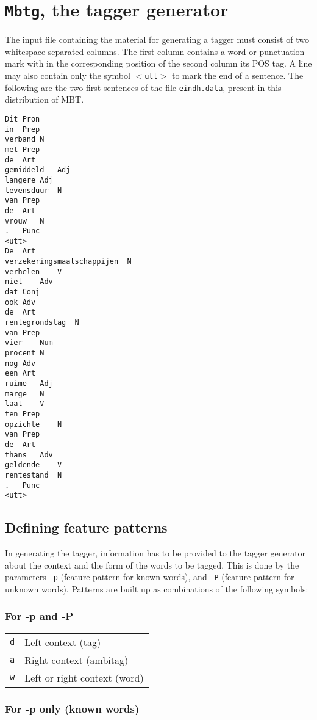 \documentclass{report}
\begin{document}
\section{{\tt Mbtg}, the tagger generator}

The input file containing the material for generating a tagger must
consist of two whitespace-separated columns. The first column contains
a word or punctuation mark with in the corresponding position of the
second column its POS tag. A line may also contain only the symbol
{\tt $<$utt$>$} to mark the end of a sentence. The following are the two first
sentences of the file {\tt eindh.data}, present in this distribution
of MBT.

{\footnotesize
\begin{verbatim}
Dit	Pron
in	Prep
verband	N
met	Prep
de	Art
gemiddeld	Adj
langere	Adj
levensduur	N
van	Prep
de	Art
vrouw	N
.	Punc
<utt>
De	Art
verzekeringsmaatschappijen	N
verhelen	V
niet	Adv
dat	Conj
ook	Adv
de	Art
rentegrondslag	N
van	Prep
vier	Num
procent	N
nog	Adv
een	Art
ruime	Adj
marge	N
laat	V
ten	Prep
opzichte	N
van	Prep
de	Art
thans	Adv
geldende	V
rentestand	N
.	Punc
<utt>
\end{verbatim}
}


\subsection{Defining feature patterns}

In generating the tagger, information has to be provided to the
tagger generator about the context and the form of the words to be
tagged. This is done by the parameters {\tt -p} (feature pattern for known
words), and {\tt -P} (feature pattern for unknown words). Patterns are
built up as combinations of the following symbols:

\subsubsection*{For -p and -P}

\begin{tabular}{ll}
{\tt d} & Left context (tag)\\
{\tt a} & Right context (ambitag)\\
{\tt w} & Left or right context (word)\\
\end{tabular}

\subsubsection*{For -p only (known words)}
\end{document}
